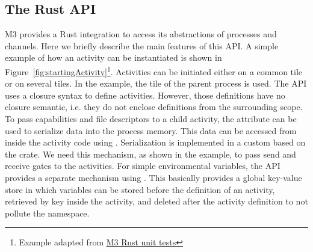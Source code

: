 \subsection{The Rust API}
M3 provides a Rust integration to access its abstractions of processes and channels. Here we briefly describe the main features of this API. A simple example of how an activity can be instantiated is shown in Figure~\ref{fig:startingActivity}\footnote{Example adapted from \href{https://github.com/Barkhausen-Institut/M3/blob/master/src/apps/rustunittests/src/tactivity.rs}{M3 Rust unit tests}}. Activities can be initiated either on a common tile or on several tiles. In the example, the tile of the parent process is used. The API uses a closure syntax to define activities. However, those definitions have no closure semantic, i.e. they do not enclose definitions from the surrounding scope.\\

To pass capabilities and file descriptors to a child activity, the attribute  can be used to serialize data into the process memory. This data can be accessed from inside the activity code using . Serialization is implemented in a custom  based on the  crate. We need this mechanism, as shown in the example, to pass send and receive gates to the activities. For simple environmental variables, the API provides a separate mechanism using . This basically provides a global key-value store in which variables can be stored before the definition of an activity, retrieved by key inside the activity, and deleted after the activity definition to not pollute the namespace.\\


